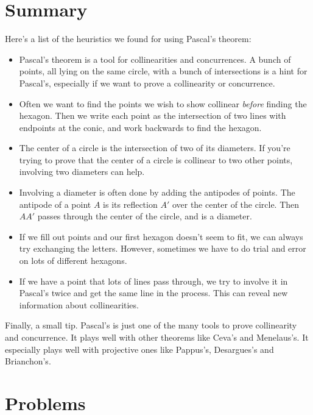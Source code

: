 \documentclass[11pt,paper=letter]{scrartcl}
\begin{document}
\section{Summary}

Here's a list of the heuristics we found for using Pascal's theorem:

\begin{itemize}

\item Pascal's theorem is a tool for collinearities and concurrences. A bunch of points, all lying on the same circle, with a bunch of intersections is a hint for Pascal's, especially if we want to prove a collinearity or concurrence.

\item Often we want to find the points we wish to show collinear \emph{before} finding the hexagon. Then we write each point as the intersection of two lines with endpoints at the conic, and work backwards to find the hexagon.

\item The center of a circle is the intersection of two of its diameters. If you're trying to prove that the center of a circle is collinear to two other points, involving two diameters can help.

\item Involving a diameter is often done by adding the antipodes of points. The antipode of a point $A$ is its reflection $A'$ over the center of the circle. Then $AA'$ passes through the center of the circle, and is a diameter.

\item If we fill out points and our first hexagon doesn't seem to fit, we can always try exchanging the letters. However, sometimes we have to do trial and error on lots of different hexagons.

\item If we have a point that lots of lines pass through, we try to involve it in Pascal's twice and get the same line in the process. This can reveal new information about collinearities.

\end{itemize}

Finally, a small tip. Pascal's is just one of the many tools to prove collinearity and concurrence. It plays well with other theorems like Ceva's and Menelaus's. It especially plays well with projective ones like Pappus's, Desargues's and Brianchon's.

\section{Problems}
\end{document}
